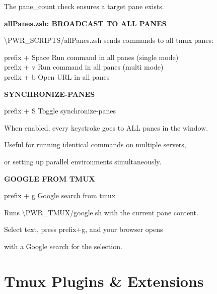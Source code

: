 \documentclass[11pt,a4paper,twoside]{book}
\begin{document}
The pane\_count check ensures a target pane exists.


\vspace{12pt}
{\bfseries\color{neonyellow} allPanes.zsh: BROADCAST TO ALL PANES}\vspace{4pt}

\textbackslash{}PWR\_SCRIPTS/allPanes.zsh sends commands to all tmux panes:

\begin{codebox}
prefix + Space   Run command in all panes (single mode)\\
prefix + v       Run command in all panes (multi mode)\\
prefix + b       Open URL in all panes\\
\end{codebox}


\vspace{12pt}
{\bfseries\color{neonyellow} SYNCHRONIZE-PANES}\vspace{4pt}

\begin{codebox}
prefix + S   Toggle synchronize-panes\\
\end{codebox}

When enabled, every keystroke goes to ALL panes in the window.

Useful for running identical commands on multiple servers,

or setting up parallel environments simultaneously.


\vspace{12pt}
{\bfseries\color{neonyellow} GOOGLE FROM TMUX}\vspace{4pt}

\begin{codebox}
prefix + g   Google search from tmux\\
\end{codebox}

Runs \textbackslash{}PWR\_TMUX/google.sh with the current pane content.

Select text, press prefix+g, and your browser opens

with a Google search for the selection.


\vspace{16pt}

\section{Tmux Plugins \& Extensions}
\end{document}
